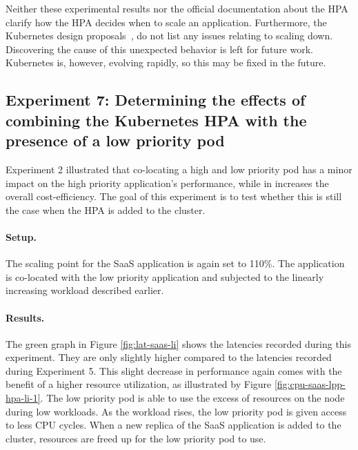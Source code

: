 Neither these experimental results nor the official documentation about the HPA~\citep{HPA} clarify how the HPA decides when to scale an application. Furthermore, the Kubernetes design proposals~\citep{autoscaling-design-proposals}, do not list any issues relating to scaling down. Discovering the cause of this unexpected behavior is left for future work. Kubernetes is, however, evolving rapidly, so this may be fixed in the future.  

\subsection{Experiment 7: Determining the effects of combining the Kubernetes HPA with the presence of a low priority pod}
Experiment 2 illustrated that co-locating a high and low priority pod has a minor impact on the high priority application's performance, while in increases the overall cost-efficiency. The goal of this experiment is to test whether this is still the case when the HPA is added to the cluster. 

\paragraph{Setup.}
The scaling point for the SaaS application is again set to 110\%. The application is co-located with the low priority application and subjected to the linearly increasing workload described earlier.


\paragraph{Results.}
The green graph in Figure \ref{fig:lat-saas-li} shows the latencies recorded during this experiment. They are only slightly higher compared to the latencies recorded during Experiment 5. This slight decrease in performance again comes with the benefit of a higher resource utilization, as illustrated by Figure \ref{fig:cpu-saas-lpp-hpa-li-1}. The low priority pod is able to use the excess of resources on the node during low workloads. As the workload rises, the low priority pod is given access to less CPU cycles. When a new replica of the SaaS application is added to the cluster, resources are freed up for the low priority pod to use. 

